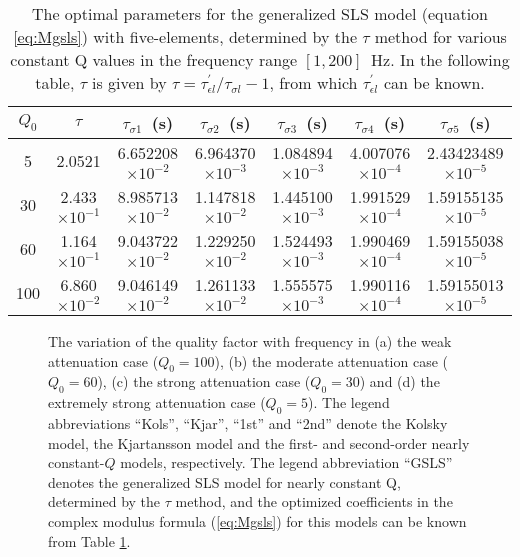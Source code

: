 \documentclass[article]{./macros/elsarticle_qh}
\begin{document}
\begin{table}[H]
\centering
\caption{The optimal parameters for the generalized SLS model (equation \ref{eq:Mgsls}) with five-elements, determined by the $\tau$ method \cite[]{blanch:1995,bohlen:2002} for various constant Q values in the frequency range $[1,200]$~Hz. In the following table, $\tau$ is given by $\tau=\tau_{\epsilon l}^\prime / \tau_{\sigma l} - 1$, from which $\tau_{\epsilon l}^\prime$ can be known.}
\label{tab:tabl10}
\small{
\begin{tabular}{c c c c c c c}
\toprule
$Q_{0}$ & $\tau$ & $\tau_{\sigma 1}$~(s) & $\tau_{\sigma 2}$~(s) & $\tau_{\sigma 3}$~(s)& $\tau_{\sigma 4}$~(s) & $\tau_{\sigma 5}$~(s)  \\
\midrule
5   & 2.0521     & 6.652208 $\times 10^{-2}$ & 6.964370 $\times 10^{-3}$ & 1.084894 $\times 10^{-3}$ & 4.007076 $\times 10^{-4}$ & 2.43423489 $\times 10^{-5}$  \\
30  & 2.433 $\times 10^{-1}$	 & 8.985713 $\times 10^{-2}$ & 1.147818 $\times 10^{-2}$ & 1.445100 $\times 10^{-3}$ & 1.991529 $\times 10^{-4}$ & 1.59155135 $\times 10^{-5}$ \\
60  & 1.164 $\times 10^{-1}$	 & 9.043722 $\times 10^{-2}$ & 1.229250 $\times 10^{-2}$ & 1.524493 $\times 10^{-3}$ & 1.990469 $\times 10^{-4}$ & 1.59155038 $\times 10^{-5}$ \\
100 & 6.860 $\times 10^{-2}$	 & 9.046149 $\times 10^{-2}$ & 1.261133  $\times 10^{-2}$ & 1.555575 $\times 10^{-3}$ & 1.990116 $\times 10^{-4}$ & 1.59155013 $\times 10^{-5}$ \\
\bottomrule   
\end{tabular}
}
\end{table}


\begin{figure}[H]
\centering
{}
\caption{
The variation of the quality factor with frequency in (a) the weak attenuation case ($Q_{0} = 100$), (b) the moderate attenuation case ($Q_{0} = 60$), (c) the strong attenuation case ($Q_{0} = 30$) and (d) the extremely strong attenuation case ($Q_{0} = 5$).  The legend abbreviations ``Kols'', ``Kjar'', ``1st'' and ``2nd'' denote the Kolsky model, the Kjartansson model and the first- and second-order nearly constant-$Q$ models, respectively. The legend abbreviation ``GSLS'' denotes the generalized SLS model for nearly constant Q, determined by the $\tau$ method, and the optimized coefficients in the complex modulus formula (\ref{eq:Mgsls}) for this models can be known from Table \ref{tab:tabl10}. 
}
\label{fig:fig1}
\end{figure}
\end{document}
